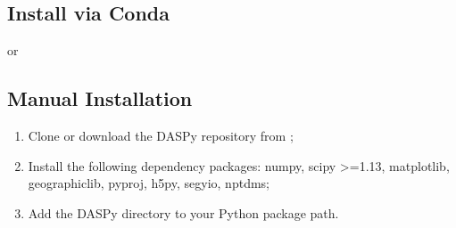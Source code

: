 \documentclass[letterpaper,10pt,english]{sphinxmanual}
\begin{document}
\begin{sphinxVerbatim}[commandchars=\\\{\}]
   
\end{sphinxVerbatim}


\subsection{Install via Conda}
\label{\detokenize{Installation:install-via-conda}}
\begin{sphinxVerbatim}[commandchars=\\\{\}]
  
\end{sphinxVerbatim}

\sphinxAtStartPar
or

\begin{sphinxVerbatim}[commandchars=\\\{\}]
  
\end{sphinxVerbatim}


\subsection{Manual Installation}
\label{\detokenize{Installation:manual-installation}}\begin{enumerate}
%
\item {} 
\sphinxAtStartPar
Clone or download the DASPy repository from ;

\item {} 
\sphinxAtStartPar
Install the following dependency packages: numpy, scipy >=1.13, matplotlib, geographiclib, pyproj, h5py, segyio, nptdms;

\item {} 
\sphinxAtStartPar
Add the DASPy directory to your Python package path.

\end{enumerate}

\sphinxstepscope
\end{document}
